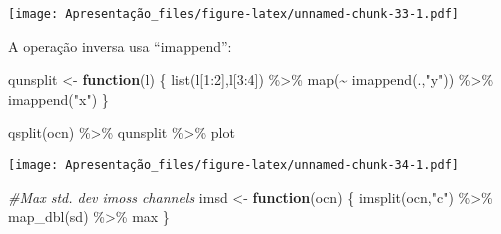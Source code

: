\documentclass[
]{article}
\newenvironment{Shaded}{\begin{snugshade}}{\end{snugshade}}
\newcommand{\CommentTok}[1]{\textcolor[rgb]{0.56,0.35,0.01}{\textit{#1}}}
\newcommand{\ControlFlowTok}[1]{\textcolor[rgb]{0.13,0.29,0.53}{\textbf{#1}}}
\newcommand{\DecValTok}[1]{\textcolor[rgb]{0.00,0.00,0.81}{#1}}
\newcommand{\FunctionTok}[1]{\textcolor[rgb]{0.00,0.00,0.00}{#1}}
\newcommand{\NormalTok}[1]{#1}
\newcommand{\OtherTok}[1]{\textcolor[rgb]{0.56,0.35,0.01}{#1}}
\newcommand{\SpecialCharTok}[1]{\textcolor[rgb]{0.00,0.00,0.00}{#1}}
\newcommand{\StringTok}[1]{\textcolor[rgb]{0.31,0.60,0.02}{#1}}
\begin{document}
\texttt{[image: Apresentação\_files/figure-latex/unnamed-chunk-33-1.pdf]}

A operação inversa usa ``imappend'':

\begin{Shaded}
\begin{Highlighting}[]
\NormalTok{qunsplit }\OtherTok{\textless{}{-}} \ControlFlowTok{function}\NormalTok{(l)}
\NormalTok{\{}
    \FunctionTok{list}\NormalTok{(l[}\DecValTok{1}\SpecialCharTok{:}\DecValTok{2}\NormalTok{],l[}\DecValTok{3}\SpecialCharTok{:}\DecValTok{4}\NormalTok{]) }\SpecialCharTok{\%\textgreater{}\%} \FunctionTok{map}\NormalTok{(}\SpecialCharTok{\textasciitilde{}} \FunctionTok{imappend}\NormalTok{(.,}\StringTok{"y"}\NormalTok{)) }\SpecialCharTok{\%\textgreater{}\%} \FunctionTok{imappend}\NormalTok{(}\StringTok{"x"}\NormalTok{)}
\NormalTok{\}}

\FunctionTok{qsplit}\NormalTok{(ocn) }\SpecialCharTok{\%\textgreater{}\%}\NormalTok{ qunsplit }\SpecialCharTok{\%\textgreater{}\%}\NormalTok{ plot}
\end{Highlighting}
\end{Shaded}

\texttt{[image: Apresentação\_files/figure-latex/unnamed-chunk-34-1.pdf]}

\begin{Shaded}
\begin{Highlighting}[]
\CommentTok{\#Max std. dev imoss channels}
\NormalTok{imsd }\OtherTok{\textless{}{-}} \ControlFlowTok{function}\NormalTok{(ocn)}
\NormalTok{\{}
    \FunctionTok{imsplit}\NormalTok{(ocn,}\StringTok{"c"}\NormalTok{) }\SpecialCharTok{\%\textgreater{}\%} \FunctionTok{map\_dbl}\NormalTok{(sd) }\SpecialCharTok{\%\textgreater{}\%}\NormalTok{ max}
\NormalTok{\}}
\end{Highlighting}
\end{Shaded}
\end{document}
